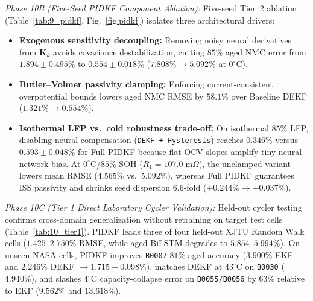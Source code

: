 \documentclass[10pt,a4paper]{article}
\begin{document}
\emph{Phase 10B (Five-Seed PIDKF Component Ablation):} Five-seed Tier~2 ablation (Table~\ref{tab:9_pidkf}, Fig.~\ref{fig:pidkf}) isolates three architectural drivers:
\begin{itemize}
\item \textbf{Exogenous sensitivity decoupling:} Removing noisy neural derivatives from $\mathbf{K}_k$ avoids covariance destabilization, cutting $85\%$ aged NMC error from $1.894\pm0.495\%$ to $0.554\pm0.018\%$ ($7.808\% \rightarrow 5.092\%$ at $0^\circ\text{C}$).
\item \textbf{Butler--Volmer passivity clamping:} Enforcing current-consistent overpotential bounds lowers aged NMC RMSE by $58.1\%$ over Baseline DEKF ($1.321\% \rightarrow 0.554\%$).
\item \textbf{Isothermal LFP vs.\ cold robustness trade-off:} On isothermal $85\%$ LFP, disabling neural compensation (\texttt{DEKF + Hysteresis}) reaches $0.346\%$ versus $0.593\pm0.048\%$ for Full PIDKF because flat OCV slopes amplify tiny neural-network bias. At $0^\circ\text{C}$/$85\%$ SOH ($R_1 = 107.0\;\mathrm{m}\Omega$), the unclamped variant lowers mean RMSE ($4.565\%$ vs.\ $5.092\%$), whereas Full PIDKF guarantees ISS passivity and shrinks seed dispersion $6.6$-fold ($\pm 0.244\% \rightarrow \pm 0.037\%$).
\end{itemize}

\emph{Phase 10C (Tier 1 Direct Laboratory Cycler Validation):} Held-out cycler testing confirms cross-domain generalization without retraining on target test cells (Table~\ref{tab:10_tier1}). PIDKF leads three of four held-out XJTU Random Walk cells ($1.425\text{--}2.750\%$ RMSE, while aged BiLSTM degrades to $5.854\text{--}5.994\%$). On unseen NASA cells, PIDKF improves \texttt{B0007} $81\%$ aged accuracy ($3.900\%$ EKF and $2.246\%$ DEKF $\rightarrow 1.715\pm0.098\%$), matches DEKF at $43^\circ\text{C}$ on \texttt{B0030} ($4.940\%$), and slashes $4^\circ\text{C}$ capacity-collapse error on \texttt{B0055/B0056} by $63\%$ relative to EKF ($9.562\%$ and $13.618\%$).
\end{document}

